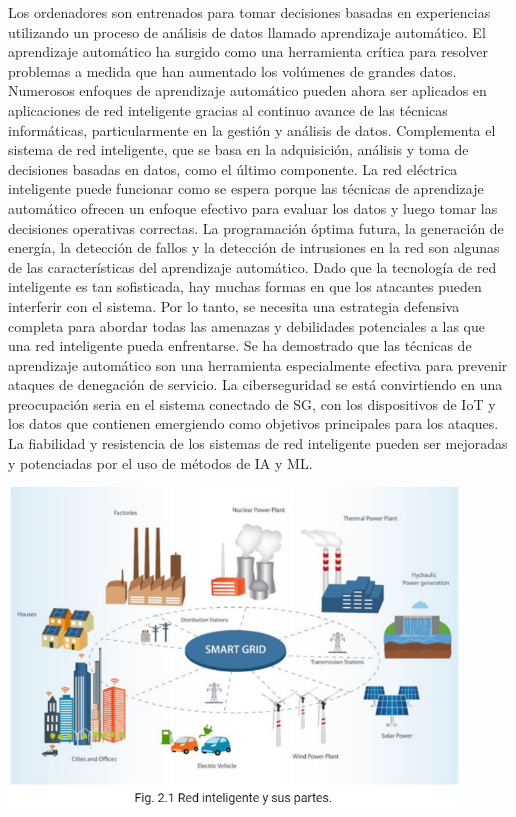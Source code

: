 \documentclass[crop=false]{standalone}
\begin{document}
{Los ordenadores son entrenados para tomar decisiones basadas en experiencias utilizando un proceso de análisis de datos llamado aprendizaje automático. El aprendizaje automático ha surgido como una herramienta crítica para resolver problemas a medida que han aumentado los volúmenes de grandes datos. Numerosos enfoques de aprendizaje automático pueden ahora ser aplicados en aplicaciones de red inteligente gracias al continuo avance de las técnicas informáticas, particularmente en la gestión y análisis de datos. Complementa el sistema de red inteligente, que se basa en la adquisición, análisis y toma de decisiones basadas en datos, como el último componente. La red eléctrica inteligente puede funcionar como se espera porque las técnicas de aprendizaje automático ofrecen un enfoque efectivo para evaluar los datos y luego tomar las decisiones operativas correctas. La programación óptima futura, la generación de energía, la detección de fallos y la detección de intrusiones en la red son algunas de las características del aprendizaje automático.
Dado que la tecnología de red inteligente es tan sofisticada, hay muchas formas en que los atacantes pueden interferir con el sistema. Por lo tanto, se necesita una estrategia defensiva completa para abordar todas las amenazas y debilidades potenciales a las que una red inteligente pueda enfrentarse. Se ha demostrado que las técnicas de aprendizaje automático son una herramienta especialmente efectiva para prevenir ataques de denegación de servicio. La ciberseguridad se está convirtiendo en una preocupación seria en el sistema conectado de SG, con los dispositivos de IoT y los datos que contienen emergiendo como objetivos principales para los ataques. La fiabilidad y resistencia de los sistemas de red inteligente pueden ser mejoradas y potenciadas por el uso de métodos de IA y ML.}
\begin{center}
\includegraphics[width=0.9\textwidth]{images/foto_texto_traducido.PNG}
\end{center}
\end{document}
